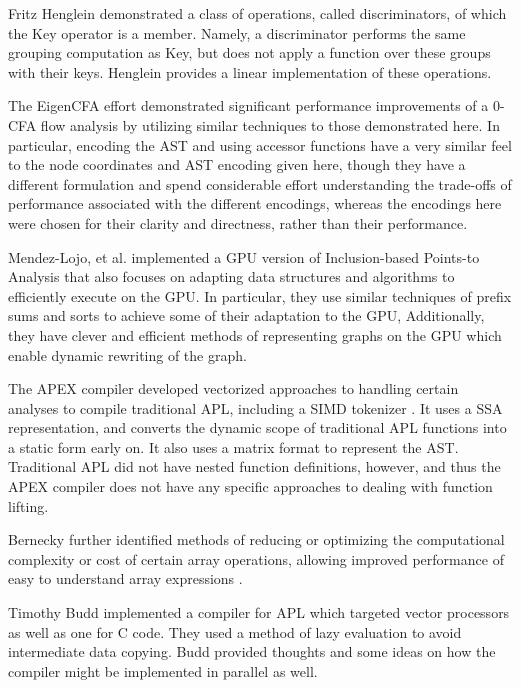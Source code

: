 \documentclass[numbers,preprint]{sigplanconf}
\begin{document}
Fritz Henglein demonstrated a class of operations, called
discriminators, of which the Key operator is a member.  
\cite{henglein2013dd}
Namely,
a discriminator performs the same grouping computation as Key, but
does not apply a function over these groups with their keys. Henglein
provides a linear implementation of these operations.

The EigenCFA effort \cite{prabhu2011eigencfa} demonstrated significant performance
improvements of a 0-CFA flow analysis by utilizing similar techniques
to those demonstrated here. In particular, encoding the AST and using
accessor functions have a very similar feel to the node coordinates and
AST encoding given here, though they have a different formulation and
spend considerable effort understanding the trade-offs of performance
associated with the different encodings, whereas the encodings here
were chosen for their clarity and directness, rather than their
performance.

Mendez-Lojo, et al. implemented a GPU version of Inclusion-based
Points-to Analysis \cite{mendez2012inclusion} that also focuses on 
adapting data structures
and algorithms to efficiently execute on the GPU. In particular,
they use similar techniques of prefix sums and sorts to achieve some
of their adaptation to the GPU, Additionally, they have clever and
efficient methods of representing graphs on the GPU which enable
dynamic rewriting of the graph.

The APEX compiler \cite{bernecky1997apex} developed vectorized approaches to handling
certain analyses to compile traditional APL, including a SIMD tokenizer
\cite{bernecky2003tokenizer}.
 It uses a SSA representation, and converts the dynamic scope of
traditional APL functions into a static form early on. It also uses
a matrix format to represent the AST. Traditional APL did not have
nested function definitions, however, and thus the APEX compiler does
not have any specific approaches to dealing with function lifting.

Bernecky further identified methods of reducing or optimizing the
computational complexity or cost of certain array operations, allowing
improved performance of easy to understand array expressions
\cite{bernecky1999reducing}.

Timothy Budd implemented a compiler \cite{budd1984apl,budd2012apl} for APL which targeted
vector processors as well as one for C code. They used a method of
lazy evaluation to avoid intermediate data copying. Budd provided
thoughts and some ideas on how the compiler might be implemented in
parallel as well.
\end{document}
